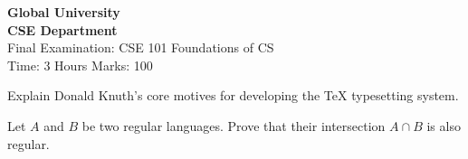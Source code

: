 \documentclass[11pt]{exam}
\begin{document}
\begin{center}
    {\large \bfseries Global University} \\
    {\large \bfseries CSE Department} \\
    \vspace{0.5cm}
    Final Examination: CSE 101 Foundations of CS \\
    Time: 3 Hours \hfill Marks: 100
\end{center}

\vspace{1cm}
\begin{questions}

\question[10] Explain Donald Knuth's core motives for developing the TeX typesetting system.

\question[15] Let $A$ and $B$ be two regular languages. Prove that their intersection $A \cap B$ is also regular.

\end{questions}
\end{document}
